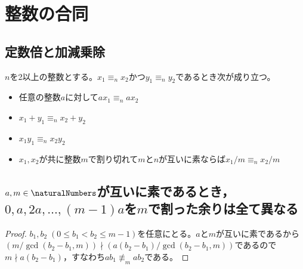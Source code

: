 \chapter{整数の合同}
    \section{定数倍と加減乗除}
        $n$を2以上の整数とする。$x_1\equiv_n x_2$かつ$y_1\equiv_n y_2$であるとき次が成り立つ。
        \begin{itemize}
            \item 任意の整数$a$に対して$a x_1 \equiv_n a x_2$
            \item $x_1+y_1 \equiv_n x_2+y_2$
            \item $x_1y_1 \equiv_n x_2y_2$
            \item $x_1,x_2$が共に整数$m$で割り切れて$m$と$n$が互いに素ならば$x_1/m \equiv_n x_2/m$
        \end{itemize}
    \section{\texorpdfstring{$a,m\in \naturalNumbers$}{自然数a,m}が互いに素であるとき，\texorpdfstring{$0,a,2a,\dotsc,(m-1)a$}{0,a,2a,...,(m-1)a}を\texorpdfstring{$m$}{m}で割った余りは全て異なる}
        \label{a,mが互いに素のとき，0,a,...a(m-1)をmで割った余りは全て異なる}
        \begin{proof}
            $b_1,b_2\;(0 \leq b_1 < b_2 \leq m-1)$を任意にとる。$a$と$m$が互いに素であるから$(m/\gcd(b_2-b_1, m)) \nmid (a(b_2-b_1)/\gcd(b_2-b_1, m))$であるので$m \nmid a(b_2-b_1)$，すなわち$ab_1 \not \equiv_m ab_2$である。
        \end{proof}
